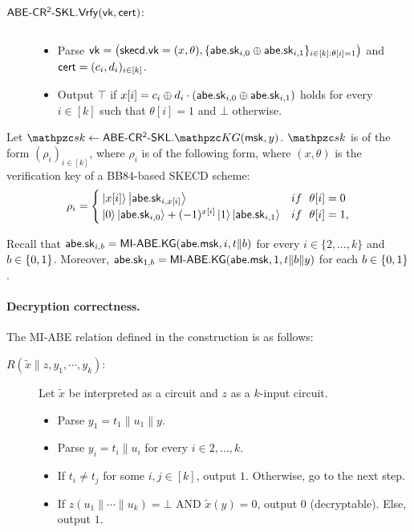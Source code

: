 \begin{description}
\item[$\mathsf{ABE}\textrm{-}\mathsf{CR^2}\textrm{-}\mathsf{SKL}.\mathsf{Vrfy}(\mathsf{vk},\mathsf{cert})$:] $ $
\begin{itemize}
\item Parse $\mathsf{vk} = \big(\mathsf{skecd}.\mathsf{vk}=(x,\theta), \{\mathsf{abe}.\mathsf{sk}_{i,0}
\oplus \mathsf{abe}.\mathsf{sk}_{i,1}\}_{i\in[k]:\theta[i]=1}\big)$ and $\mathsf{cert} =
(c_i,d_i)_{i \in [k]}$.

\item Output $\top$ if $x[i]=c_i\oplus
    d_i\cdot(\mathsf{abe}.\mathsf{sk}_{i,0}\oplus\mathsf{abe}.\mathsf{sk}_{i,1})$ holds for every
    $i\in[k]$ such that $\theta[i]=1$ and $\bot$ otherwise.

\end{itemize}
\end{description}

Let $\qsk \gets\ABECRCRSKL.\qKG(\msk, y)$. $\qsk$ is of the form
$(\rho_i)_{i \in [k]}$, where $\rho_i$ is of the following form, where
$(x, \theta)$ is the verification key of a BB84-based SKECD scheme:
\begin{align}
\rho_i=
\begin{cases}
    \ket{x[i]}\ket{\mathsf{abe}.\mathsf{sk}_{i,x[i]}} & if~~ \theta[i]=0\\
    \ket{0}\ket{\mathsf{abe}.\mathsf{sk}_{i,0}}+(-1)^{x[i]}\ket{1}\ket{\mathsf{abe}.\mathsf{sk}_{i,1}} & if~~ \theta[i]=1,
\end{cases}
\end{align}

Recall that $\mathsf{abe}.\mathsf{sk}_{i, b} = \mathsf{MI}\textrm{-}\mathsf{ABE}.\mathsf{KG}(\mathsf{abe}.\mathsf{msk}, i, t\|b)$ for every
$i \in \{2, \ldots, k\}$ and $b \in \{0,1\}$. Moreover, 
$\mathsf{abe}.\mathsf{sk}_{1, b} = \mathsf{MI}\textrm{-}\mathsf{ABE}.\mathsf{KG}(\mathsf{abe}.\mathsf{msk}, 1, t\|b\|y)$ for each $b \in
\{0,1\}$.

\paragraph{Decryption correctness.}
The MI-ABE relation defined in the construction is as follows:

\begin{description}
\item[$R(\widetilde{x} \| z,y_1, \cdots, y_k)$:] Let $\widetilde{x}$ be
interpreted as a circuit and $z$ as a $k$-input circuit.
\begin{itemize}
\item Parse $y_1 = t_1 \| u_1 \| y$.
\item Parse $y_i=t_i\|u_i$ for every $i\in 2, \ldots, k$.
\item If $t_i\ne t_j$ for some $i,j\in[k]$, output $1$. Otherwise, go to the next step.
\item If $z(u_1\|\cdots\|u_k) = \bot$ AND $\widetilde{x}(y) = 0$, output $0$
(decryptable). Else, output $1$.
\end{itemize}
\end{description}

